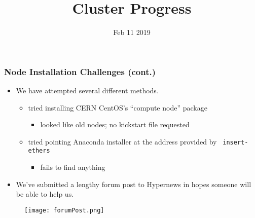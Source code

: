 \documentclass{beamer}
\title{Cluster Progress}
\date{Feb 11 2019}
\begin{document}

\begin{frame}
\titlepage
\end{frame}



\begin{frame}

  \frametitle{Node Installation Challenges (cont.)}

  \begin{itemize}
  \item We have attempted several different methods.
    \begin{itemize}
      \item tried installing CERN CentOS's ``compute node'' package
        \begin{itemize}
        \item looked like old nodes; no kickstart file requested
        \end{itemize}
      \item tried pointing Anaconda installer at the address provided by {\tt
          insert-ethers}
        \begin{itemize}
        \item fails to find anything
        \end{itemize}
    \end{itemize}
  \item We've submitted a lengthy forum post to Hypernews in hopes someone will
    be able to help us.
  \end{itemize}

  \begin{figure}[H]
    \begin{center}
      \texttt{[image: forumPost.png]}
    \end{center}
  \end{figure}

\end{frame}

\end{document}
